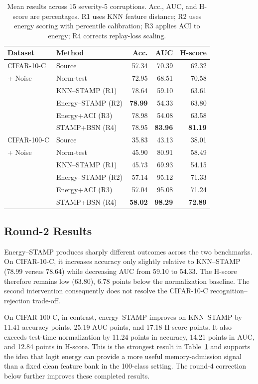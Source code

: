 \begin{table}[t]
    \caption{Mean results across 15 severity-5 corruptions. Acc., AUC, and
    H-score are percentages. R1 uses KNN feature distance; R2 uses energy
    scoring with percentile calibration; R3 applies ACI to energy; R4 corrects
    replay-loss scaling.}
    \label{tab:main-results}
    \centering
    \small
    \setlength{\tabcolsep}{3pt}
    \begin{tabular}{llrrr}
        \hline
        Dataset & Method & Acc. & AUC & H-score \\
        \hline
        CIFAR-10-C & Source & 57.34 & 70.39 & 62.32 \\
        + Noise & Norm-test & 72.95 & 68.51 & 70.58 \\
        & KNN--STAMP (R1) & 78.64 & 59.10 & 63.61 \\
        & Energy--STAMP (R2) & \textbf{78.99} & 54.33 & 63.80 \\
        & Energy+ACI (R3) & 78.98 & 54.08 & 63.58 \\
        & STAMP+BSN (R4) & 78.95 & \textbf{83.96} & \textbf{81.19} \\
        \hline
        CIFAR-100-C & Source & 35.83 & 43.13 & 38.01 \\
        + Noise & Norm-test & 45.90 & 80.91 & 58.49 \\
        & KNN--STAMP (R1) & 45.73 & 69.93 & 54.15 \\
        & Energy--STAMP (R2) & 57.14 & 95.12 & 71.33 \\
        & Energy+ACI (R3) & 57.04 & 95.08 & 71.24 \\
        & STAMP+BSN (R4) & \textbf{58.02} & \textbf{98.29} & \textbf{72.89} \\
        \hline
    \end{tabular}
\end{table}

\subsection{Round-2 Results}
Energy--STAMP produces sharply different outcomes across the two benchmarks.
On CIFAR-10-C, it increases accuracy only slightly relative to KNN--STAMP
(78.99 versus 78.64) while decreasing AUC from 59.10 to 54.33. The H-score
therefore remains low (63.80), 6.78 points below the normalization baseline.
The second intervention consequently does not resolve the CIFAR-10-C
recognition--rejection trade-off.

On CIFAR-100-C, in contrast, energy--STAMP improves on KNN--STAMP by 11.41
accuracy points, 25.19 AUC points, and 17.18 H-score points. It also exceeds
test-time normalization by 11.24 points in accuracy, 14.21 points in AUC, and
12.84 points in H-score. This is the strongest result in Table~\ref{tab:main-results}
and supports the idea that logit energy can provide a more useful memory-admission
signal than a fixed clean feature bank in the 100-class setting. The round-4
correction below further improves these completed results.

